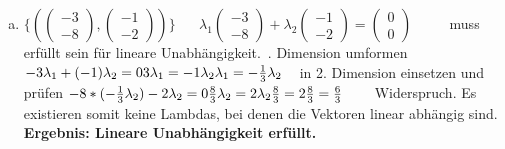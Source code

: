 \documentclass[10pt,ngerman]{scrartcl}
\begin{document}
\begin{enumerate}[1.]
\begin{enumerate}[(a)]
	\item \begin{math}\{ ( \begin{pmatrix}-3 \\ -8\end{pmatrix},\begin{pmatrix}-1 \\ -2\end{pmatrix} ) \}\end{math}
	 \newline~\newline~\newline
	\begin{math}\lambda _1 \begin{pmatrix}-3 \\ -8\end{pmatrix} + \lambda _2 \begin{pmatrix}-1 \\ -2\end{pmatrix} = \begin{pmatrix}0 \\ 0\end{pmatrix} \end{math} ~~~~ muss erfüllt sein für lineare Unabhängigkeit.\newline~. Dimension umformen\newline
	 \begin{math}
	-3 \lambda _1 + (-1) \lambda _2 = 0 \newline
	3 \lambda _1 = -1 \lambda _2 \newline
	\lambda _1 = - \frac{1}{3} \lambda _2
	\end{math}
	\newline ~ \newline
	in 2. Dimension einsetzen und prüfen\newline
	\begin{math}
	-8 * (- \frac{1}{3} \lambda _2) - 2 \lambda _2 = 0  \newline
	\frac{8}{3} \lambda _2 = 2 \lambda _2  \newline
	\frac{8}{3} = 2 \newline~\newline
	\frac{8}{3} = \frac{6}{3} \end{math} ~~~ Widerspruch. Es existieren somit keine Lambdas, bei denen die Vektoren linear abhängig sind.\newline
	\textbf{Ergebnis: Lineare Unabhängigkeit erfüllt.}\newline~\newline
	

\end{enumerate}
\end{enumerate}
\end{document}
